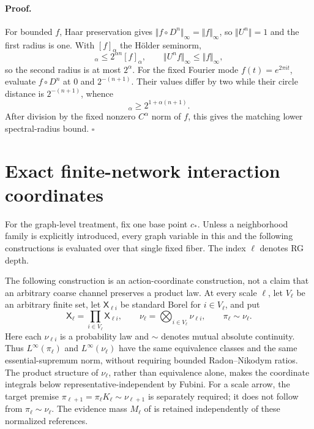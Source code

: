 \paragraph{Proof.}
For bounded \(f\), Haar preservation gives
\(\Vert f\circ D^n\Vert_\infty=\Vert f\Vert_\infty\), so
\(\Vert U^n\Vert=1\) and the first radius is one.  With
\([f]_\alpha\) the H\"older seminorm,
\begin{equation}
[f\circ D^n]_\alpha\leq2^{\alpha n}[f]_\alpha,
\qquad
\Vert U^nf\Vert_\infty\leq\Vert f\Vert_\infty,
\label{eq:rg-circle-holder-upper-bound}
\end{equation}
so the second radius is at most \(2^\alpha\).  For the fixed Fourier mode
\(f(t)=e^{2\pi it}\), evaluate \(f\circ D^n\) at \(0\) and
\(2^{-(n+1)}\).  Their values differ by two while their circle distance is
\(2^{-(n+1)}\), whence
\begin{equation}
[f\circ D^n]_\alpha\geq2^{1+\alpha(n+1)}.
\label{eq:rg-circle-holder-lower-bound}
\end{equation}
After division by the fixed nonzero \(C^\alpha\) norm of \(f\), this gives
the matching lower spectral-radius bound.  \(\square\)

\section{Exact finite-network interaction coordinates}
\label{sec:rg-finite-network-interactions}

For the graph-level treatment, fix one base point $c_*$. Unless a neighborhood
family is explicitly introduced, every graph variable in this and the following
constructions is evaluated over that single fixed fiber. The index $\ell$
denotes RG depth.

The following construction is an action-coordinate construction, not a
claim that an arbitrary coarse channel preserves a product law.  At every
scale \(\ell\), let \(V_\ell\) be an arbitrary finite set, let
\(\mathsf X_{\ell i}\) be standard Borel for \(i\in V_\ell\), and put
\begin{equation}
 \mathsf X_\ell=\prod_{i\in V_\ell}\mathsf X_{\ell i},\qquad
 \nu_\ell=\bigotimes_{i\in V_\ell}\nu_{\ell i},\qquad
 \pi_\ell\sim\nu_\ell.
 \label{eq:rg-interaction-product-reference}
\end{equation}
Here each \(\nu_{\ell i}\) is a probability law and \(\sim\) denotes
mutual absolute continuity.  Thus \(L^\infty(\pi_\ell)\) and
\(L^\infty(\nu_\ell)\) have the same equivalence classes and the same
essential-supremum norm, without requiring bounded Radon--Nikodym ratios.
The product structure of \(\nu_\ell\), rather than equivalence alone, makes
the coordinate integrals below representative-independent by Fubini.  For a scale arrow, the target premise
\(\pi_{\ell+1}=\pi_\ell K_\ell\sim\nu_{\ell+1}\) is separately required;
it does not follow from \(\pi_\ell\sim\nu_\ell\).  The evidence mass
\(M_\ell\) of  is retained independently of
these normalized references. 


